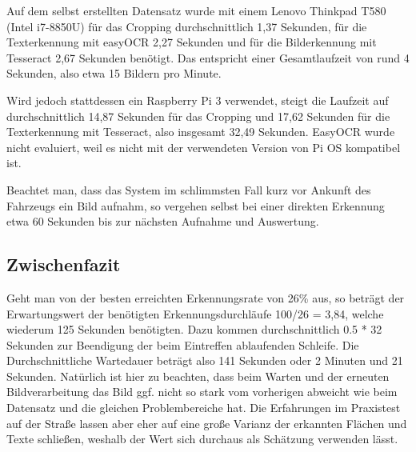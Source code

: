Auf dem selbst erstellten Datensatz wurde mit einem Lenovo Thinkpad T580 (Intel i7-8850U) für das Cropping durchschnittlich 1,37 Sekunden,
für die Texterkennung mit easyOCR 2,27 Sekunden und für die Bilderkennung mit Tesseract 2,67 Sekunden benötigt.
Das entspricht einer Gesamtlaufzeit von rund 4 Sekunden, also etwa 15 Bildern pro Minute.

Wird jedoch stattdessen ein Raspberry Pi 3 verwendet, steigt die Laufzeit auf durchschnittlich 14,87 Sekunden für das Cropping und 17,62 Sekunden für die Texterkennung mit Tesseract, also insgesamt 32,49 Sekunden.
EasyOCR wurde nicht evaluiert, weil es nicht mit der verwendeten Version von Pi OS kompatibel ist.

Beachtet man, dass das System im schlimmsten Fall kurz vor Ankunft des Fahrzeugs ein Bild aufnahm, so vergehen selbst bei einer direkten Erkennung etwa 60 Sekunden bis zur nächsten Aufnahme und Auswertung. 

\subsection{Zwischenfazit}
Geht man von der besten erreichten Erkennungsrate von 26\% aus, so beträgt der Erwartungswert der benötigten Erkennungsdurchläufe 100/26 = 3,84, welche wiederum 125 Sekunden benötigten. Dazu kommen durchschnittlich 0.5 * 32 Sekunden zur Beendigung der beim Eintreffen ablaufenden Schleife. Die Durchschnittliche Wartedauer beträgt also 141 Sekunden oder 2 Minuten und 21 Sekunden. 
\newline Natürlich ist hier zu beachten, dass beim Warten und der erneuten Bildverarbeitung das Bild ggf. nicht so stark vom vorherigen abweicht wie beim Datensatz und die gleichen Problembereiche hat. Die Erfahrungen im Praxistest auf der Straße lassen aber eher auf eine große Varianz der erkannten Flächen und Texte schließen, weshalb der Wert sich durchaus als Schätzung verwenden lässt.
